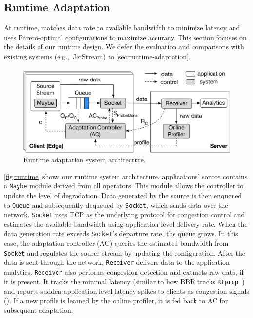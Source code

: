 \subsection{Runtime Adaptation}
\label{sec:runtime}

At runtime, \awstream{} matches data rate to available bandwidth to minimize
latency and uses Pareto-optimal configurations to maximize accuracy. This
section focuses on the details of our runtime design. We defer the evaluation
and comparisons with existing systems (e.g.,~JetStream) to
\autoref{sec:runtime-adaptation}.

\begin{figure}
  \centering
  \includegraphics[width=0.9\linewidth]{figures/runtime-adaptation.pdf}
  \caption{Runtime adaptation system architecture.}
  \label{fig:runtime}
\end{figure}

\autoref{fig:runtime} shows our runtime system architecture. \awstream{}
applications' source contains a \texttt{Maybe} module derived from all \maybe{}
operators. This module allows the controller to update the level of
degradation. Data generated by the source is then enqueued to \texttt{Queue} and
subsequently dequeued by \texttt{Socket}, which sends data over the
network. \texttt{Socket} uses TCP as the underlying protocol for congestion
control and estimates the available bandwidth using application-level delivery
rate. When the data generation rate exceeds \texttt{Socket}'s departure rate,
the queue grows. In this case, the adaptation controller (AC) queries the
estimated bandwidth from \texttt{Socket} and regulates the source stream by
updating the configuration. After the data is sent through the network,
\texttt{Receiver} delivers data to the application analytics. \texttt{Receiver}
also performs congestion detection and extracts raw data, if it is present.  It
tracks the minimal latency (similar to how BBR tracks
\texttt{RTprop}~\cite{cardwell2017bbr}) and reports sudden application-level
latency spikes to clients as congestion signals (\rc{}). If a new profile is
learned by the online profiler, it is fed back to AC for subsequent adaptation.

